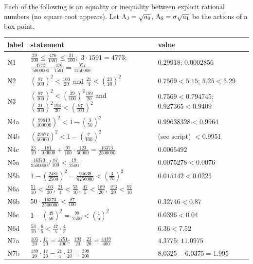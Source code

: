 \begin{lemma}\label{bpP:p14:sb-numerics}
Each of the following is an equality or inequality between explicit rational numbers (no square root appears). Let $\Lambda_{\rm J}=\sqrt{a_0}$, $\Lambda_{\rm S}=\sigma\sqrt{a_1}$ be the actions of a box point.
\begin{center}\small
\renewcommand{\arraystretch}{1.05}\setlength{\tabcolsep}{3pt}
\begin{tabular}{lll}
\hline
label & statement & value\\
\hline
N1 & $\frac{29}{100}\le\frac{476}{1591}\le\frac{31}{100}$; $\ 3\cdot1591=4773$; $\ \frac{4773}{5000000}\cdot\frac{476}{1591}=\frac{357}{1250000}$ & $0.29918$; $0.0002856$\\
N2 & $(\frac{87}{100})^2<\frac{103}{20}$ and $\frac{21}4<(\frac{23}{10})^2$ & $0.7569<5.15$; $5.25<5.29$\\
N3 & $(\frac{87}{100})^2<(\frac{29}{100})^2\frac{189}{20}$ and $(\frac{31}{100})^2\frac{193}{20}<(\frac{97}{100})^2$ & $0.7569<0.794745$; $0.927365<0.9409$\\
N4a & $(\frac{99819}{100000})^2<1-(\frac3{50})^2$ & $0.99638328<0.9964$\\
N4b & $(\frac{49877}{50000})^2<1-(\frac7{100})^2$ & (see script) $<0.9951$\\
N4c & $\frac{23}{10}\cdot\frac{181}{100000}+\frac{97}{100}\cdot\frac{123}{50000}=\frac{16373}{2500000}$ & $0.0065492$\\
N5a & $\frac{16373}{2500000}\big/\frac{87}{100}<\frac{19}{2500}$ & $0.0075278<0.0076$\\
N5b & $1-(\frac{2481}{2500})^2=\frac{94639}{6250000}<(\frac3{20})^2$ & $0.015142<0.0225$\\
N6a & $\frac{51}{10}<\frac{103}{20}$, $\frac{21}4<\frac{53}{10}$, $\frac{47}5<\frac{189}{20}$, $\frac{193}{20}<\frac{97}{10}$ & \\
N6b & $50\cdot\frac{16373}{2500000}<\frac{87}{100}$ & $0.32746<0.87$\\
N6c & $1-(\frac{49}{50})^2=\frac{99}{2500}<(\frac15)^2$ & $0.0396<0.04$\\
N6d & $\frac{53}{10}\cdot\frac65<\frac{47}5\cdot\frac45$ & $6.36<7.52$\\
N7a & $\frac{103}{20}\cdot\frac{17}{20}=\frac{1751}{400}$; $\ \frac{193}{20}\cdot\frac{23}{20}=\frac{4439}{400}$ & $4.3775$; $11.0975$\\
N7b & $\frac{189}{20}\cdot\frac{17}{20}-\frac{21}4\cdot\frac{23}{20}=\frac{399}{200}$ & $8.0325-6.0375=1.995$\\

\end{tabular}
\end{center}
\end{lemma}
